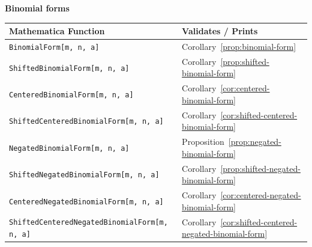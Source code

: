 \clearpage

\textbf{Binomial forms}
\begin{center}
    \renewcommand{\arraystretch}{1.3}
    \begin{tabular}{ll}
        \toprule
        \textbf{Mathematica Function}                        & \textbf{Validates / Prints}                                \\
        \midrule
        \texttt{BinomialForm[m, n, a]}                       & Corollary~\ref{prop:binomial-form}                         \\
        \texttt{ShiftedBinomialForm[m, n, a]}                & Corollary~\ref{prop:shifted-binomial-form}                 \\
        \texttt{CenteredBinomialForm[m, n, a]}               & Corollary~\ref{cor:centered-binomial-form}                 \\
        \texttt{ShiftedCenteredBinomialForm[m, n, a]}        & Corollary~\ref{cor:shifted-centered-binomial-form}         \\
        \texttt{NegatedBinomialForm[m, n, a]}                & Proposition~\ref{prop:negated-binomial-form}               \\
        \texttt{ShiftedNegatedBinomialForm[m, n, a]}         & Corollary~\ref{prop:shifted-negated-binomial-form}         \\
        \texttt{CenteredNegatedBinomialForm[m, n, a]}        & Corollary~\ref{cor:centered-negated-binomial-form}         \\
        \texttt{ShiftedCenteredNegatedBinomialForm[m, n, a]} & Corollary~\ref{cor:shifted-centered-negated-binomial-form} \\
        \bottomrule
    \end{tabular}
\end{center}

\clearpage

